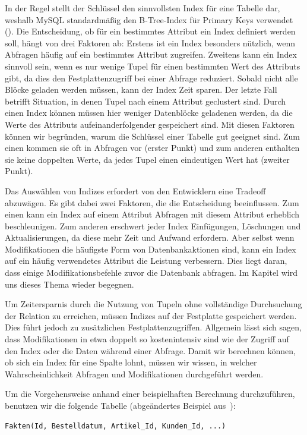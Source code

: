 In der Regel stellt der Schlüssel den sinnvollsten Index für eine Tabelle dar, weshalb MySQL standardmäßig den B-Tree-Index für Primary Keys verwendet (\cite{mysql_primary_key}).
Die Entscheidung, ob für ein bestimmtes Attribut ein Index definiert werden soll, hängt von drei Faktoren ab:
Erstens ist ein Index besonders nützlich, wenn Abfragen häufig auf ein bestimmtes Attribut zugreifen.
Zweitens kann ein Index sinnvoll sein, wenn es nur wenige Tupel für einen bestimmten Wert des Attributs gibt, da dies den Festplattenzugriff bei einer Abfrage reduziert.
Sobald nicht alle Blöcke geladen werden müssen, kann der Index Zeit sparen.
Der letzte Fall betrifft Situation, in denen Tupel nach einem Attribut geclustert sind.
Durch einen Index können müssen hier weniger Datenblöcke geladenen werden, da die Werte des Attributs aufeinanderfolgender gespeichert sind.
Mit diesen Faktoren können wir begründen, warum die Schlüssel einer Tabelle gut geeignet sind.
Zum einen kommen sie oft in Abfragen vor (erster Punkt) und zum anderen enthalten sie keine doppelten Werte, da jedes Tupel einen eindeutigen Wert hat (zweiter Punkt).

Das Auswählen von Indizes erfordert von den Entwicklern eine Tradeoff abzuwägen.
Es gibt dabei zwei Faktoren, die die Entscheidung beeinflussen.
Zum einen kann ein Index auf einem Attribut Abfragen mit diesem Attribut erheblich beschleunigen.
Zum anderen erschwert jeder Index Einfügungen, Löschungen und Aktualisierungen, da diese mehr Zeit und Aufwand erfordern.
Aber selbst wenn Modifikationen die häufigste Form von Datenbankaktionen sind, kann ein Index auf ein häufig verwendetes Attribut die Leistung verbessern.
Dies liegt daran, dass einige Modifikationsbefehle zuvor die Datenbank abfragen.
Im Kapitel  wird uns dieses Thema wieder begegnen.

Um Zeitersparnis durch die Nutzung von Tupeln ohne vollständige Durchsuchung der Relation zu erreichen, müssen Indizes auf der Festplatte gespeichert werden.
Dies führt jedoch zu zusätzlichen Festplattenzugriffen.
Allgemein lässt sich sagen, dass Modifikationen in etwa doppelt so kostenintensiv sind wie der Zugriff auf den Index oder die Daten während einer Abfrage.
Damit wir berechnen können, ob sich ein Index für eine Spalte lohnt, müssen wir wissen, in welcher Wahrscheinlichkeit Abfragen und Modifikationen durchgeführt werden.

Um die Vorgehensweise anhand einer beispielhaften Berechnung durchzuführen, benutzen wir die folgende Tabelle (abgeändertes Beispiel aus~\cite[pp. 355--357]{garcia2008database}):
\vspace{-4pt}
\begin{lstlisting}
Fakten(Id, Bestelldatum, Artikel_Id, Kunden_Id, ...)
\end{lstlisting}
\vspace{-8pt}


